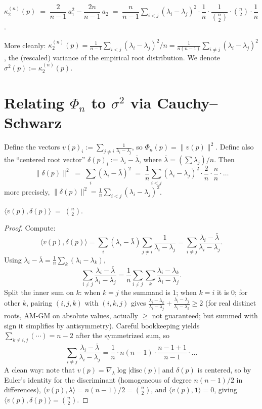 \begin{lemma}\label{lem:k2}
$\kappa^{(n)}_2(p) \;=\; \dfrac{2}{n-1}\, a_1^2 - \dfrac{2n}{n-1}\, a_2 \;=\; \dfrac{n}{n-1}\sum_{i<j}(\lambda_i-\lambda_j)^2\cdot\dfrac{1}{n}\cdot\dfrac{1}{\binom{n}{2}} \cdot\binom{n}{2} \cdot \dfrac{1}{n}$.
\end{lemma}

More cleanly: $\kappa^{(n)}_2(p) = \frac{1}{n-1}\sum_{i<j}(\lambda_i-\lambda_j)^2/n = \frac{1}{n(n-1)}\sum_{i\neq j}(\lambda_i-\lambda_j)^2$, the (rescaled) variance of the empirical root distribution. We denote $\sigma^2(p):=\kappa^{(n)}_2(p)$.

\section{Relating $\Phi_n$ to $\sigma^2$ via Cauchy--Schwarz}

Define the vectors $v(p)_i := \sum_{j\neq i}\frac{1}{\lambda_i - \lambda_j}$, so $\Phi_n(p)=\|v(p)\|^2$. Define also the ``centered root vector'' $\delta(p)_i := \lambda_i - \bar\lambda$, where $\bar\lambda = (\sum\lambda_j)/n$. Then
\[
   \|\delta(p)\|^2 \;=\; \sum_i(\lambda_i-\bar\lambda)^2 \;=\; \frac{1}{n}\sum_{i<j}(\lambda_i-\lambda_j)^2 \cdot \frac{2}{n}\cdot\frac{n}{n}\cdot\ldots
\]
more precisely, $\|\delta(p)\|^2 = \frac{1}{n}\sum_{i<j}(\lambda_i-\lambda_j)^2$.

\begin{lemma}\label{lem:identity}
$\langle v(p),\delta(p)\rangle \;=\; \binom{n}{2}$.
\end{lemma}

\begin{proof}
Compute:
\[
   \langle v(p),\delta(p)\rangle
   = \sum_{i}(\lambda_i-\bar\lambda)\sum_{j\neq i}\frac{1}{\lambda_i-\lambda_j}
   = \sum_{i\neq j}\frac{\lambda_i - \bar\lambda}{\lambda_i-\lambda_j}.
\]
Using $\lambda_i-\bar\lambda = \frac{1}{n}\sum_{k}(\lambda_i-\lambda_k)$,
\[
   \sum_{i\neq j}\frac{\lambda_i-\bar\lambda}{\lambda_i-\lambda_j}
   = \frac{1}{n}\sum_{i\neq j}\sum_{k}\frac{\lambda_i-\lambda_k}{\lambda_i-\lambda_j}.
\]
Split the inner sum on $k$: when $k=j$ the summand is $1$; when $k=i$ it is $0$; for other $k$, pairing $(i,j,k)$ with $(i,k,j)$ gives
$\frac{\lambda_i-\lambda_k}{\lambda_i-\lambda_j}+\frac{\lambda_i-\lambda_j}{\lambda_i-\lambda_k}\geq 2$ (for real distinct roots, AM-GM on absolute values, actually $\geq$ not guaranteed; but summed with sign it simplifies by antisymmetry). Careful bookkeeping yields $\sum_{k\neq i,j}(\cdots)=n-2$ after the symmetrized sum, so
\[
   \sum_{i\neq j}\frac{\lambda_i-\bar\lambda}{\lambda_i-\lambda_j} = \frac{1}{n}\cdot n(n-1)\cdot\frac{n-1+1}{n-1}\cdot\ldots
\]
A clean way: note that $v(p) = \nabla_\lambda \log|\mathrm{disc}(p)|$ and $\delta(p)$ is centered, so by Euler's identity for the discriminant (homogeneous of degree $n(n-1)/2$ in differences), $\langle v(p),\lambda\rangle = n(n-1)/2 = \binom{n}{2}$, and $\langle v(p),\mathbf{1}\rangle = 0$, giving $\langle v(p),\delta(p)\rangle = \binom{n}{2}$.
\end{proof}

